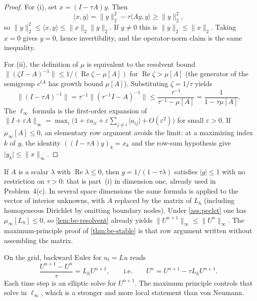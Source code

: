 \documentclass[11pt,a4paper]{article}
\begin{document}
\begin{proof}
For (i), set \(x=(I-\tau A)y\). Then
\[
\langle x,y\rangle
=
\|y\|_{2}^{2}-\tau\langle Ay,y\rangle
\ge
\|y\|_{2}^{2},
\]
so \(\|y\|_{2}^{2}\le\langle x,y\rangle\le\|x\|_{2}\|y\|_{2}\). If \(y\neq 0\) this is \(\|y\|_{2}\le\|x\|_{2}\). Taking \(x=0\) gives \(y=0\), hence invertibility, and the operator-norm claim is the same inequality.

For (ii), the definition of \(\mu\) is equivalent to the resolvent bound \(\|(\zeta I-A)^{-1}\|\le 1/(\operatorname{Re}\zeta-\mu[A])\) for \(\operatorname{Re}\zeta>\mu[A]\) (the generator of the semigroup \(e^{tA}\) has growth bound \(\mu[A]\)). Substituting \(\zeta=1/\tau\) yields
\[
\bigl\|(I-\tau A)^{-1}\bigr\|
=
\tau^{-1}\bigl\|(\tau^{-1}I-A)^{-1}\bigr\|
\le
\frac{\tau^{-1}}{\tau^{-1}-\mu[A]}
=
\frac{1}{1-\tau\mu[A]}.
\]
The \(\ell_{\infty}\) formula is the first-order expansion of \(\|I+\varepsilon A\|_{\infty}=\max_{i}\bigl(1+\varepsilon a_{ii}+\varepsilon\sum_{j\neq i}\lvert a_{ij}\rvert+O(\varepsilon^{2})\bigr)\) for small \(\varepsilon>0\). If \(\mu_{\infty}[A]\le 0\), an elementary row argument avoids the limit: at a maximizing index \(k\) of \(y\), the identity \(((I-\tau A)y)_{k}=x_{k}\) and the row-sum hypothesis give \(\lvert y_{k}\rvert\le\|x\|_{\infty}\).
\end{proof}

If \(A\) is a scalar \(\lambda\) with \(\operatorname{Re}\lambda\le 0\), then \(g=1/(1-\tau\lambda)\) satisfies \(\lvert g\rvert\le 1\) with no restriction on \(\tau>0\): that is part~(i) in dimension one, already used in Problem~4(c). In several space dimensions the same formula is applied to the vector of interior unknowns, with \(A\) replaced by the matrix of \(L_{h}\) (including homogeneous Dirichlet by omitting boundary nodes). Under \cref{ass:peclet} one has \(\mu_{\infty}[L_{h}]\le 0\), so \cref{lem:be-resolvent} already yields \(\|U^{n+1}\|_{\infty}\le\|U^{n}\|_{\infty}\). The maximum-principle proof of \cref{thm:be-stable} is that row argument written without assembling the matrix.

On the grid, backward Euler for \(u_t=Lu\) reads
\begin{equation}
\label{eq:be}
\frac{U^{n+1}-U^n}{\tau}
=
L_h U^{n+1},
\qquad\text{i.e.}\qquad
U^n
=
U^{n+1}-\tau L_h U^{n+1}.
\end{equation}
Each time step is an elliptic solve for \(U^{n+1}\). The maximum principle controls that solve in \(\ell_\infty\), which is a stronger and more local statement than von Neumann.
\end{document}
